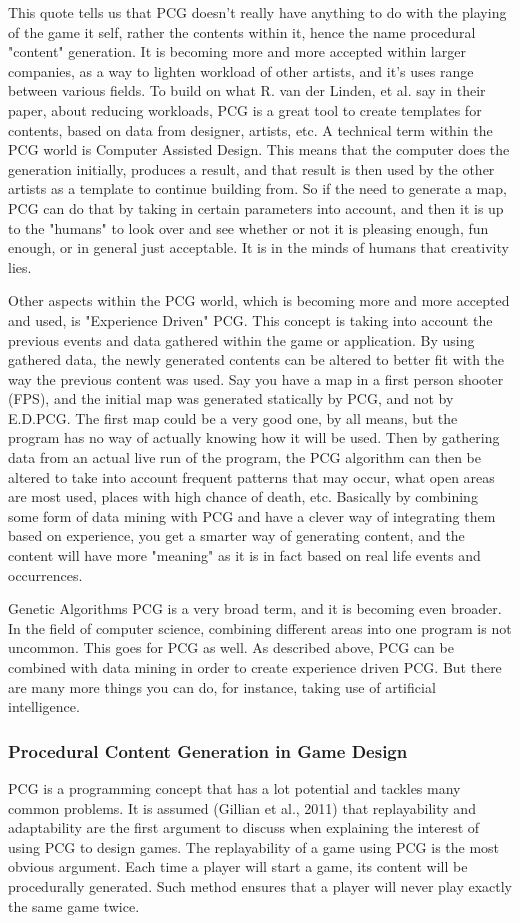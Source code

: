 This quote tells us that PCG doesn't really have anything to do with the playing of the game it self, rather the contents within it, hence the name procedural "content" generation. It is becoming more and more accepted within larger companies, as a way to lighten workload of other artists, and it's uses range between various fields.
To build on what R. van der Linden, et al. say in their paper, about reducing workloads, PCG is a great tool to create templates for contents, based on data from designer, artists, etc. A technical term within the PCG world is Computer Assisted Design. This means that the computer does the generation initially, produces a result, and that result is then used by the other artists as a template to continue building from. So if the need to generate a map, PCG can do that by taking in certain parameters into account, and then it is up to the "humans" to look over and see whether or not it is pleasing enough, fun enough, or in general just acceptable. It is in the minds of humans that creativity lies. 

Other aspects within the PCG world, which is becoming more and more accepted and used, is "Experience Driven" PCG. This concept is taking into account the previous events and data gathered within the game or application. By using gathered data, the newly generated contents can be altered to better fit with the way the previous content was used. Say you have a map in a first person shooter (FPS), and the initial map was generated statically by PCG, and not by E.D.PCG. The first map could be a very good one, by all means, but the program has no way of actually knowing how it will be used. Then by gathering data from an actual live run of the program, the PCG algorithm can then be altered to take into account frequent patterns that may occur, what open areas are most used, places with high chance of death, etc. Basically by combining some form of data mining with PCG and have a clever way of integrating them based on experience, you get a smarter way of generating content, and the content will have more "meaning" as it is in fact based on real life events and occurrences.

Genetic Algorithms
PCG is a very broad term, and it is becoming even broader. In the field of computer science, combining different areas into one program is not uncommon. This goes for PCG as well. As described above, PCG can be combined with data mining in order to create experience driven PCG. But there are many more things you can do, for instance, taking use of artificial intelligence. 

\subsubsection{Procedural Content Generation in Game Design}

PCG is a programming concept that has a lot potential and tackles many common problems. It is assumed (Gillian et al., 2011) that replayability and adaptability are the first argument to discuss when explaining the interest of using PCG to design games. The replayability of a game using PCG is the most obvious argument. Each time a player will start a game, its content will be procedurally generated. Such method ensures that a player will never play exactly the same game twice. 
